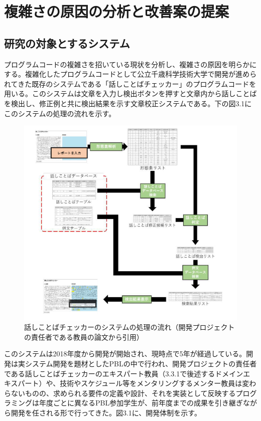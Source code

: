 \documentclass[12pt, a4paper]{jreport}
\begin{document}
\chapter{複雑さの原因の分析と改善案の提案}
\section{研究の対象とするシステム}
プログラムコードの複雑さを招いている現状を分析し、複雑さの原因を明らかにする。複雑化したプログラムコードとして公立千歳科学技術大学で開発が進められてきた既存のシステムである「話しことばチェッカー」のプログラムコードを用いる。このシステムは文章を入力し検出ボタンを押すと文章内から話しことばを検出し、修正例と共に検出結果を示す文章校正システムである。下の図3.1にこのシステムの処理の流れを示す。
\begin{figure}[H]
\centering
\includegraphics[width=1\linewidth]{image/cqcNagare.png}
\caption{話しことばチェッカーのシステムの処理の流れ（開発プロジェクトの責任者である教員の論文\cite{Yamashita}から引用）}
\label{fig:enter-label}
\end{figure}
このシステムは2018年度から開発が開始され、現時点で5年が経過している。開発は実システム開発を題材としたPBLの中で行われ、開発プロジェクトの責任者である話しことばチェッカーのエキスパート教員（3.3.1で後述するドメインエキスパート）や、技術やスケジュール等をメンタリングするメンター教員は変わらないものの、求められる要件の定義や設計、それを実装として反映するプログラミングは年度ごとに異なるPBL参加学生が、前年度までの成果を引き継ぎながら開発を任される形で行ってきた。図3.1に、開発体制を示す。
\end{document}

